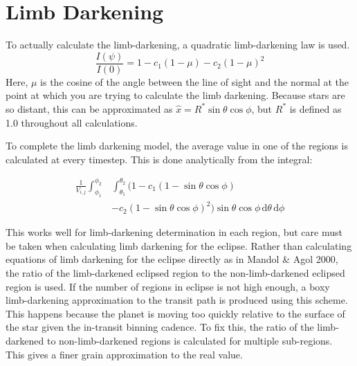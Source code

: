

\section{Limb Darkening}
To actually calculate the limb-darkening, a quadratic limb-darkening law is used.
\begin{equation}
   \frac{I(\psi)}{I(0)} = 1 - c_1 (1 - \mu) - c_2 (1 - \mu)^2
\end{equation}
Here, $\mu$ is the cosine of the angle between the line of sight and the normal at the point at which you are trying to calculate the limb darkening. Because stars are so distant, this can be approximated as $\hat{x} = R^* \sin{\theta}\cos{\phi}$, but $R^{*}$ is defined as 1.0 throughout all calculations.

To complete the limb darkening model, the average value in one of the regions is calculated at every timestep. This is done analytically from the integral:

\begin{equation}
\begin{split}
    \frac{1}{V_{i,j}} \int_{\phi_1}^{\phi_2} & \int_{\theta_1}^{\theta_2}  (1 - c_1 (1 - \sin{\theta}\cos{\phi}) \\ &- c_2 (1 - \sin{\theta}\cos{\phi})^2) \sin{\theta}\cos{\phi}\,\mathrm{d}\theta \, \mathrm{d}\phi
\end{split}
\end{equation}

This works well for limb-darkening determination in each region, but care must be taken when calculating limb darkening for the eclipse. Rather than calculating equations of limb darkening for the eclipse directly as in Mandol \& Agol 2000, the ratio of the limb-darkened eclipsed region to the non-limb-darkened eclipsed region is used. If the number of regions in eclipse is not high enough, a boxy limb-darkening approximation to the transit path is produced using this scheme. This happens because the planet is moving too quickly relative to the surface of the star given the in-transit binning cadence. To fix this, the ratio of the limb-darkened to non-limb-darkened regions is calculated for multiple sub-regions. This gives a finer grain approximation to the real value.

